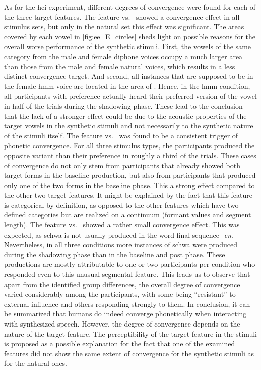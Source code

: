 As for the \ac{hci} experiment, different degrees of convergence were found for each of the three target features.
The feature \textipa{[E:]} vs.\ \textipa{[e:]} showed a convergence effect in all stimulus sets, but only in the natural set this effect was significant.
The areas covered by each vowel in \cref{fig:ee_E_circles} sheds light on possible reasons for the overall worse performance of the synthetic stimuli.
First, the vowels of the same category from the male and female diphone voices occupy a much larger area than those from the male and female natural voices, which results in a less distinct convergence target.
And second, all instances that are supposed to be \textipa{[E:]} in the female \ac{hmm} voice are located in the area of \textipa{[e:]}.
Hence, in the \ac{hmm} condition, all participants with preference \textipa{[e:]} actually heard their preferred version of the vowel in half of the trials during the shadowing phase.
These lead to the conclusion that the lack of a stronger effect could be due to the acoustic properties of the target vowels in the synthetic stimuli and not necessarily to the synthetic nature of the stimuli itself.
The feature \textipa{[I\c{c}]} vs.\ \textipa{[Ik]} was found to be a consistent trigger of phonetic convergence.
For all three stimulus types, the participants produced the opposite variant than their preference in roughly a third of the trials.
These cases of convergence do not only stem from participants that already showed both target forms in the baseline production, but also from participants that produced only one of the two forms in the baseline phase.
This a strong effect compared to the other two target features.
It might be explained by the fact that this feature is categorical by definition, as opposed to the other features which have two defined categories but are realized on a continuum (formant values and segment length).
The feature \textipa{[\s{n}]} vs.\ \textipa{[@n]} showed a rather small convergence effect.
This was expected, as schwa is not usually produced in the word-final sequence \textit{-en}.
Nevertheless, in all three conditions more instances of schwa were produced during the shadowing phase than in the baseline and post phase.
These productions are mostly attributable to one or two participants per condition who responded even to this unusual segmental feature.
This leads us to observe that apart from the identified group differences, the overall degree of convergence varied considerably among the participants, with some being \enquote{resistant} to external influence and others responding strongly to them.
In conclusion, it can be summarized that humans do indeed converge phonetically when interacting with synthesized speech.
However, the degree of convergence depends on the nature of the target feature.
The perceptibility of the target feature in the stimuli is proposed as a possible explanation for the fact that one of the examined features did not show the same extent of convergence for the synthetic stimuli as for the natural ones.

